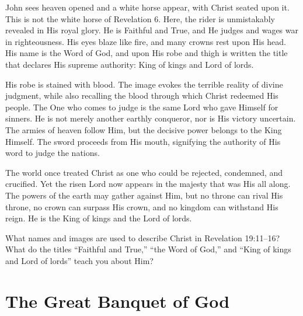 John sees heaven opened and a white horse appear, with Christ seated upon it. This is not the white horse of Revelation 6. Here, the rider is unmistakably revealed in His royal glory. He is Faithful and True, and He judges and wages war in righteousness. His eyes blaze like fire, and many crowns rest upon His head. His name is the Word of God, and upon His robe and thigh is written the title that declares His supreme authority: King of kings and Lord of lords.

His robe is stained with blood. The image evokes the terrible reality of divine judgment, while also recalling the blood through which Christ redeemed His people. The One who comes to judge is the same Lord who gave Himself for sinners. He is not merely another earthly conqueror, nor is His victory uncertain. The armies of heaven follow Him, but the decisive power belongs to the King Himself. The sword proceeds from His mouth, signifying the authority of His word to judge the nations.

The world once treated Christ as one who could be rejected, condemned, and crucified. Yet the risen Lord now appears in the majesty that was His all along. The powers of the earth may gather against Him, but no throne can rival His throne, no crown can surpass His crown, and no kingdom can withstand His reign. He is the King of kings and the Lord of lords.

\begin{ReaderQuestion}
What names and images are used to describe Christ in Revelation 19:11--16? What do the titles “Faithful and True,” “the Word of God,” and “King of kings and Lord of lords” teach you about Him?
\end{ReaderQuestion}

\section{The Great Banquet of God}

